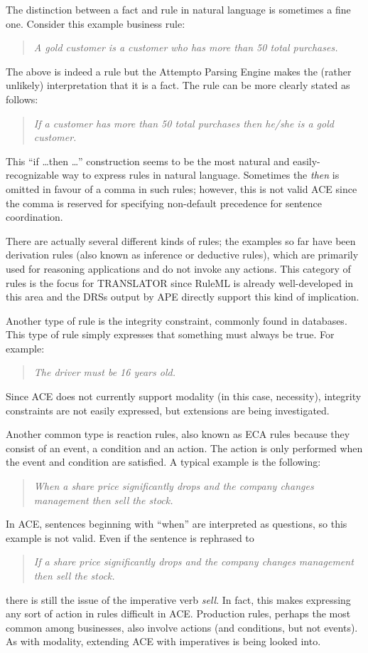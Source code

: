 \documentclass[12pt]{report}
\begin{document}
The distinction between a fact and rule in natural language is sometimes a fine one. Consider this example business rule:
\begin{quote}
\textit{A gold customer is a customer who has more than 50 total purchases.}
\end{quote}
The above is indeed a rule but the Attempto Parsing Engine makes the (rather unlikely) interpretation that it is a fact. The rule can be more clearly stated as follows:
\begin{quote}
\textit{If a customer has more than 50 total purchases then he/she is a gold customer.}
\end{quote}
This ``if \ldots then \ldots'' construction seems to be the most natural and easily-recognizable way to express rules in natural language. Sometimes the \textit{then} is omitted in favour of a comma in such rules; however, this is not valid ACE since the comma is reserved for specifying non-default precedence for sentence coordination.

There are actually several different kinds of rules; the examples so far have been derivation rules (also known as inference or deductive rules), which are primarily used for reasoning applications and do not invoke any actions. This category of rules is the focus for TRANSLATOR since RuleML is already well-developed in this area and the DRSs output by APE directly support this kind of implication.

Another type of rule is the integrity constraint, commonly found in databases. This type of rule simply expresses that something must always be true. For example:
\begin{quote}
\textit{The driver must be 16 years old.}
\end{quote}
Since ACE does not currently support modality (in this case, necessity), integrity constraints are not easily expressed, but extensions are being investigated.

Another common type is reaction rules, also known as ECA rules because they consist of an event, a condition and an action. The action is only performed when the event and condition are satisfied. A typical example is the following:
\begin{quote}
\textit{When a share price significantly drops and the company changes management then sell the stock.}
\end{quote}
In ACE, sentences beginning with ``when'' are interpreted as questions, so this example is not valid. Even if the sentence is rephrased to 
\begin{quote}
\textit{If a share price significantly drops and the company changes management then sell the stock.}
\end{quote}
there is still the issue of the imperative verb \textit{sell}. In fact, this makes expressing any sort of action in rules difficult in ACE. Production rules, perhaps the most common among businesses, also involve actions (and conditions, but not events). As with modality, extending ACE with imperatives is being looked into.
\end{document}
